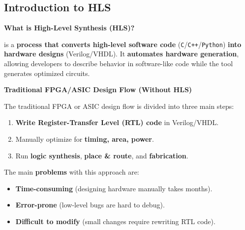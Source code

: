 \subsection{Introduction to HLS}

\begin{flushleft}
    \textcolor{Green3}{ \textbf{What is High-Level Synthesis (HLS)?}}
\end{flushleft}
 is a \textbf{process that converts high-level software code} (\texttt{C}/\texttt{C++}/\texttt{Python}) \textbf{into hardware designs} (Verilog/VHDL). It \textbf{automates hardware generation}, allowing developers to describe behavior in software-like code while the tool generates optimized circuits.

\highspace
\begin{flushleft}
    \textcolor{Red2}{ \textbf{Traditional FPGA/ASIC Design Flow (Without HLS)}}
\end{flushleft}
The traditional FPGA or ASIC design flow is divided into three main steps:
\begin{enumerate}
    \item \textbf{Write Register-Transfer Level (RTL) code} in Verilog/VHDL.
    \item Manually optimize for \textbf{timing, area, power}.
    \item Run \textbf{logic synthesis}, \textbf{place \& route}, and \textbf{fabrication}.
\end{enumerate}
The main \textbf{problems} with this approach are:
\begin{itemize}[label=\textcolor{Red2}{}]
    \item \textcolor{Red2}{\textbf{Time-consuming}} (designing hardware manually takes months).
    \item \textcolor{Red2}{\textbf{Error-prone}} (low-level bugs are hard to debug).
    \item \textcolor{Red2}{\textbf{Difficult to modify}} (small changes require rewriting RTL code).
\end{itemize}

